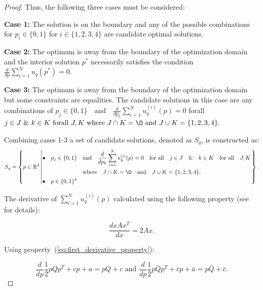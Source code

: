 \documentclass[10pt]{article}
\begin{document}
\begin{proof}
    Thus, the following three cases must be considered:

    \textbf{Case 1:} The solution is on the boundary and any of the possible
    combinations for $p_i \in \{0, 1\}$ for $i \in \{1, 2, 3, 4\}$ are candidate
    optimal solutions.

    \textbf{Case 2:} The optimum is away from the boundary of the optimization
    domain and the interior solution $p^*$ necessarily satisfies the condition
    \(\frac{d}{dp} \sum\limits_{i=1} ^ N  u_q(p^*) = 0\).

    \textbf{Case 3:} The optimum is away from the boundary of the optimization
    domain but some constraints are equalities. The candidate solutions in this
    case are any combinations of $p_j \in \{0, 1\} \quad \text{and} \quad
    \frac{d}{dp_k} \sum\limits_{i=1} ^ N  u_q^{(i)}(p) = 0$ forall $ j \in J
    \text{ \& } k \in K \text{ forall } J, K \text{ where } J \cap K = \O
    \text{ and } J \cup K = \{1, 2, 3, 4\}.$

    Combining cases 1-3 a set of candidate solutions, denoted as \(S_q\), is
    constructed as: {\scriptsize
    \begin{equation*}
        S_q =
        \left\{p \in \mathbb{R} ^ 4 \left|
            \begin{aligned}
                \bullet\quad p_j \in \{0, 1\} & \quad \text{and} \quad \frac{d}{dp_k}
                \sum\limits_{i=1} ^ N  u_q^{(i)}(p) = 0
                \quad \text{for all} \quad j \in J \quad \&  \quad k \in K  \quad \text{for all} \quad J, K \\
                & \quad \text{where} \quad J \cap K = \O \quad
                \text{and} \quad J \cup K = \{1, 2, 3, 4\}.\\
                \bullet\quad  p \in \{0, 1\} ^ 4
            \end{aligned}\right.
        \right\}.
    \end{equation*}}

    The derivative of \(\sum\limits_{i=1} ^ N  u_q^{(i)}(p)\) calculated using
    the following property (see~\cite{Abadir2005} for details):

    \begin{equation}\label{eq:first_derivative_property}
    \frac{d x A x^T}{dx} =  2Ax.
    \end{equation}

    Using property~(\ref{eq:first_derivative_property}):

    \begin{equation}\label{eq:quadratics_derivatives}
    \frac{d}{dp} \frac{1}{2}pQp^T + cp + a = pQ + c \text{ and } \frac{d}{dp} \frac{1}{2}p\bar{Q}p^T + \bar{c}p + \bar{a} = p\bar{Q} + \bar{c}.
    \end{equation}


\end{proof}
\end{document}
